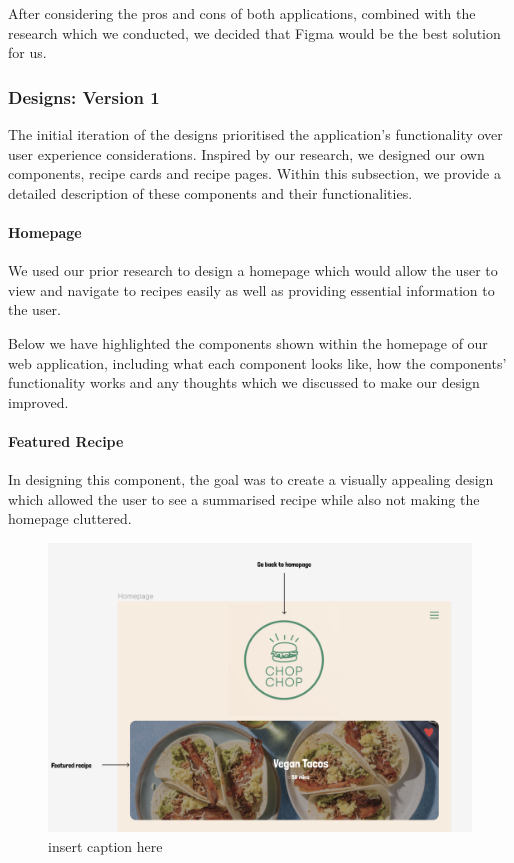 \documentclass{article}
\begin{document}
After considering the pros and cons of both applications, combined with the research which we conducted, we decided that Figma would be the best solution for us.

\subsubsection{Designs: Version 1}
The initial iteration of the designs prioritised the application's functionality over user experience considerations. Inspired by our research, we designed our own components, recipe cards and recipe pages. Within this subsection, we provide a detailed description of these components and their functionalities.

\paragraph{Homepage}
We used our prior research to design a homepage which would allow the user to view and navigate to recipes easily as well as providing essential information to the user.

Below we have highlighted the components shown within the homepage of our web application, including what each component looks like, how the components' functionality works and any thoughts which we discussed to make our design improved.

\paragraph{Featured Recipe}
In designing this component, the goal was to create a visually appealing design which allowed the user to see 
a summarised recipe while also not making the homepage cluttered.

\begin{figure}[h]
  \includegraphics[width=1.0\textwidth]{assets/Version 1 Featured Recipe.png}
  \centering
  \caption{insert caption here}
\end{figure}
\end{document}
